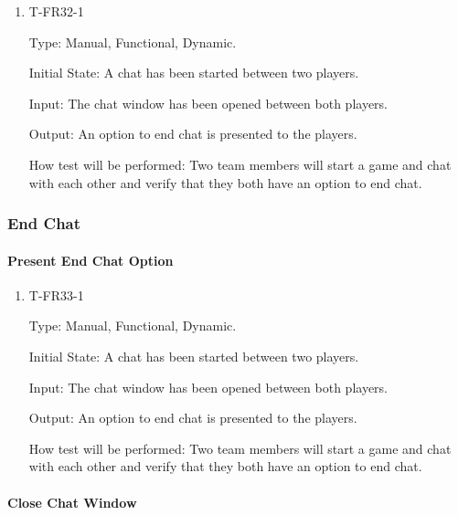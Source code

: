 \documentclass[12pt, titlepage]{article}
\begin{document}
        \begin{enumerate}

        \item{T-FR32-1\\}

            Type: Manual, Functional, Dynamic.
            					
            Initial State: A chat has been started between two players.
            					
            Input: The chat window has been opened between both players.
            					
            Output: An option to end chat is presented to the players.

            How test will be performed: Two team members will start a game and chat with each other and verify that they both have an option to end chat.

        \end{enumerate}
        
\subsubsection{End Chat}
		
    \paragraph{Present End Chat Option}

        \begin{enumerate}

        \item{T-FR33-1\\}

            Type: Manual, Functional, Dynamic.
            					
            Initial State: A chat has been started between two players.
            					
            Input: The chat window has been opened between both players.
            					
            Output: An option to end chat is presented to the players.

            How test will be performed: Two team members will start a game and chat with each other and verify that they both have an option to end chat.

        \end{enumerate}
    
    \paragraph{Close Chat Window}
\end{document}

